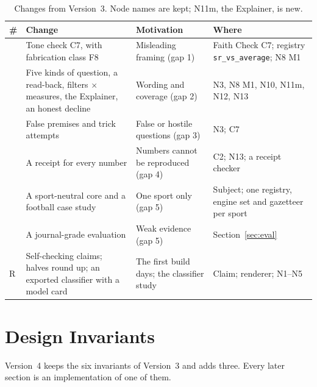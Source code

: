 \documentclass[11pt,a4paper]{article}
\begin{document}
\begin{table}[htbp]
\centering
\footnotesize
\renewcommand{\arraystretch}{1.25}
\begin{tabular}{@{}>{\raggedright\arraybackslash}p{0.4cm}
                  >{\raggedright\arraybackslash}p{5.0cm}
                  >{\raggedright\arraybackslash}p{5.4cm}
                  >{\raggedright\arraybackslash}p{4.2cm}@{}}
\toprule
\textbf{\#} & \textbf{Change} & \textbf{Motivation} & \textbf{Where} \\
\midrule
1 & Tone check C7, with fabrication class F8 & Misleading framing (gap 1) & Faith Check C7; registry \texttt{sr\_vs\_average}; N8 M1 \\
2 & Five kinds of question, a read-back, filters $\times$ measures, the Explainer, an honest decline & Wording and coverage (gap 2) & N3, N8 M1, N10, N11m, N12, N13 \\
3 & False premises and trick attempts & False or hostile questions (gap 3) & N3; C7 \\
4 & A receipt for every number & Numbers cannot be reproduced (gap 4) & C2; N13; a receipt checker \\
5 & A sport-neutral core and a football case study & One sport only (gap 5) & Subject; one registry, engine set and gazetteer per sport \\
6 & A journal-grade evaluation & Weak evidence (gap 5) & Section~\ref{sec:eval} \\
R & Self-checking claims; halves round up; an exported classifier with a model card & The first build days; the classifier study & Claim; renderer; N1--N5 \\
\bottomrule
\end{tabular}
\caption{Changes from Version~3. Node names are kept; N11m, the
Explainer, is new.}
\label{tab:changes}
\end{table}

\section{Design Invariants}
\label{sec:invariants}

Version~4 keeps the six invariants of Version~3 and adds three. Every later
section is an implementation of one of them.
\end{document}
